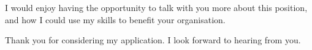 \documentclass[11pt, a4paper]{awesome-cv} %
\begin{document}
I would enjoy having the opportunity to talk with you more about this position, and how I could use my skills to benefit your organisation. 

Thank you for considering my application. I look forward to hearing from you.

\makeletterclosing %
\end{document}
